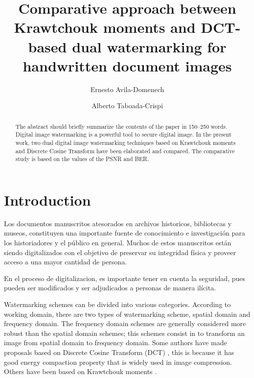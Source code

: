 \documentclass[runningheads]{llncs}
\begin{document}
%
\title{Comparative approach between Krawtchouk moments and DCT-based dual watermarking for handwritten document images}
%
%
\author{Ernesto Avila-Domenech \and
Alberto Taboada-Crispi}
%
%
%
\maketitle              %
%
\begin{abstract}
The abstract should briefly summarize the contents of the paper in
150--250 words. Digital image watermarking is a powerful tool to secure digital image. In the present work, two dual digital image watermarking techniques based on Krawtchouk moments and Discrete Cosine Transform have been elaborated and compared. The comparative study is based on the values of the PSNR and BER.

\end{abstract}
%
%
%
\section{Introduction}
Los documentos manuscritos atesorados en archivos historicos, bibliotecas y museos, constituyen una importante fuente de conocimiento e investigación para los historiadores y el público en general. Muchos de estos manuscritos están siendo digitalizados con el objetivo de preservar su integridad física y proveer acceso a una mayor cantidad de persona.

En el proceso de digitalizacion, es importante tener en cuenta la seguridad, pues pueden ser modificados y ser adjudicados a personas de manera ilícita.

Watermarking schemes can be divided into various categories. According to working domain, there are two types of watermarking scheme, spatial domain and frequency domain. The frequency domain schemes are generally considered more robust than the spatial domain schemes; this schemes consist in to transform an image from spatial domain to frequency domain. Some authors have made proposals based on Discrete Cosine Transform (DCT) \cite{munoz2018robust,wang2018blind}, this is because it has good energy compaction property that is widely used in image compression. Others have been based on Krawtchouk moments \cite{liu2017fractional,papakostas2014moment,Yap2004}.
\end{document}
